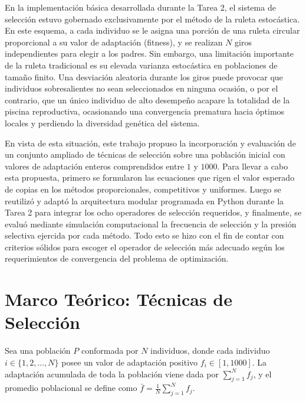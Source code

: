 \documentclass[11pt,letterpaper]{article}
\begin{document}
En la implementación básica desarrollada durante la Tarea 2, el sistema de selección estuvo gobernado exclusivamente por el método de la ruleta estocástica. En este esquema, a cada individuo se le asigna una porción de una ruleta circular proporcional a su valor de adaptación (fitness), y se realizan $N$ giros independientes para elegir a los padres. Sin embargo, una limitación importante de la ruleta tradicional es su elevada varianza estocástica en poblaciones de tamaño finito. Una desviación aleatoria durante los giros puede provocar que individuos sobresalientes no sean seleccionados en ninguna ocasión, o por el contrario, que un único individuo de alto desempeño acapare la totalidad de la piscina reproductiva, ocasionando una convergencia prematura hacia óptimos locales y perdiendo la diversidad genética del sistema.

En vista de esta situación, este trabajo propuso la incorporación y evaluación de un conjunto ampliado de técnicas de selección sobre una población inicial con valores de adaptación enteros comprendidos entre $1$ y $1000$. Para llevar a cabo esta propuesta, primero se formularon las ecuaciones que rigen el valor esperado de copias en los métodos proporcionales, competitivos y uniformes. Luego se reutilizó y adaptó la arquitectura modular programada en Python durante la Tarea 2 para integrar los ocho operadores de selección requeridos, y finalmente, se evaluó mediante simulación computacional la frecuencia de selección y la presión selectiva ejercida por cada método. Todo esto se hizo con el fin de contar con criterios sólidos para escoger el operador de selección más adecuado según los requerimientos de convergencia del problema de optimización.

\section{Marco Teórico: Técnicas de Selección}
Sea una población $P$ conformada por $N$ individuos, donde cada individuo $i \in \{1, 2, \dots, N\}$ posee un valor de adaptación positivo $f_i \in [1, 1000]$. La adaptación acumulada de toda la población viene dada por $\sum_{j=1}^{N} f_j$, y el promedio poblacional se define como $\bar{f} = \frac{1}{N}\sum_{j=1}^{N} f_j$.
\end{document}
